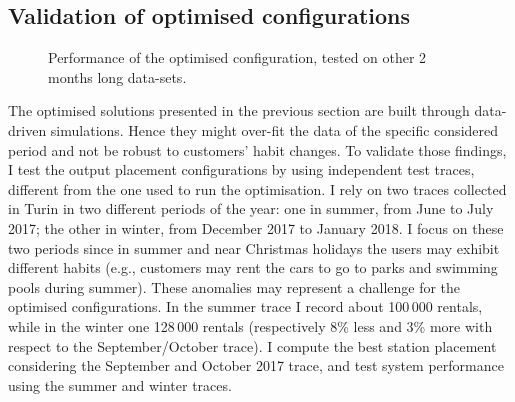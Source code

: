 \subsection{Validation of optimised configurations}

\begin{figure}[t]
    \centering     %

    \caption{Performance of the optimised configuration, tested on other 2 months long data-sets.}
    \label{fig:validation}
\end{figure}

The optimised solutions presented in the previous section are built through data-driven simulations. Hence they might over-fit the data of the specific considered period and not be robust to customers' habit changes. To validate those findings, I test the output placement configurations by using independent test traces, different from the one used to run the optimisation. 
I rely on two traces collected in Turin in two different periods of the year: one in summer, from June to July 2017; the other in winter, from December 2017 to January 2018. I focus on these two periods since in summer and near Christmas holidays the users may exhibit different habits (e.g., customers may rent the cars to go to parks and swimming pools during summer). These anomalies may represent a challenge for the optimised configurations.
In the summer trace I record about  100\,000 rentals, while in the winter one 128\,000 rentals (respectively 8\% less and 3\% more with respect to the September/October trace). I compute the best station placement considering the September and October 2017 trace, and test system performance using the summer and winter traces.  


